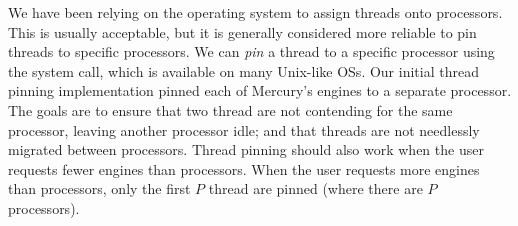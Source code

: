 We have been relying on the operating system to assign threads onto
processors.
This is usually acceptable,
but it is generally considered more reliable to pin threads to specific
processors.
We can \emph{pin} a thread to a specific processor using the
 system call,
which is available on many Unix-like OSs.
Our initial thread pinning implementation pinned each of Mercury's engines
to a separate processor.
The goals are to ensure that two thread are not contending for the same
processor, leaving another processor idle;
and that threads are not needlessly migrated between processors.
Thread pinning should also work when the user requests fewer engines
than processors.
When the user requests more engines than processors,
only the first $P$ thread are pinned (where there are $P$ processors).




